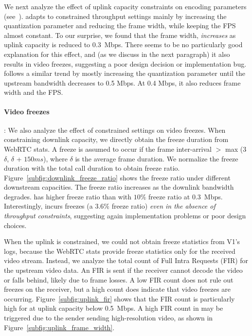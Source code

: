 We next analyze the effect of uplink capacity constraints on encoding
parameters
(see~).
\teams adapts to constrained throughput settings mainly by increasing the
quantization parameter and reducing the frame width, while keeping the FPS
almost constant. To our surprise, we found that the frame width, {\em
increases} as uplink capacity is reduced to 0.3~Mbps.
There seems to be no particularly good explanation for this effect, and (as we
discuss in the next paragraph) it also results in video freezes, suggesting a
poor design decision or implementation bug.  \meet follows a similar trend by
mostly increasing the quantization parameter until the upstream bandwidth
decreases to 0.5 Mbps. At 0.4 Mbps, it also reduces frame width and the FPS. 

\paragraph{Video freezes}: We also analyze the effect of constrained settings
on video freezes. When constraining downlink capacity, we directly obtain the freeze duration
from WebRTC stats. A freeze is assumed to occur if the frame
inter-arrival $>$ max (3$\delta$, $\delta$ + $150 ms$), where $\delta$ is the
average frame duration. We normalize the freeze duration with the total call
duration to obtain freeze ratio.  Figure~\ref{subfig:downlink_freeze_ratio}
shows the freeze ratio under different downstream capacities. The freeze ratio
increases as the downlink bandwidth degrades. \meet has higher freeze ratio than \teamsbrowser with $10\%$ freeze ratio at 0.3~Mbps. Interestingly,
\teamsbrowser incurs freezes (a $3.6\%$ freeze ratio) {\em even in the absence
of throughput constraints}, suggesting again implementation problems or poor
design choices.

When the uplink is constrained, we could not obtain freeze statistics
from V1's logs, because the WebRTC stats provide freeze statistics only for
the received video stream.  Instead, we analyze the total count of Full Intra
Requests (FIR) for the upstream video data. An FIR is sent if the receiver
cannot decode the video or falls behind, likely due to frame losses.  A low
FIR count does not rule out freezes on the receiver, but a high count does
indicate that video freezes are occurring.  Figure~\ref{subfig:uplink_fir}
shows that the FIR count is particularly high for \teamsbrowser at uplink
capacity below 0.5~Mbps. A high FIR count in \teamsbrowser may be triggered
due to the sender sending high-resolution video, as shown in
Figure~\ref{subfig:uplink_frame_width}.


